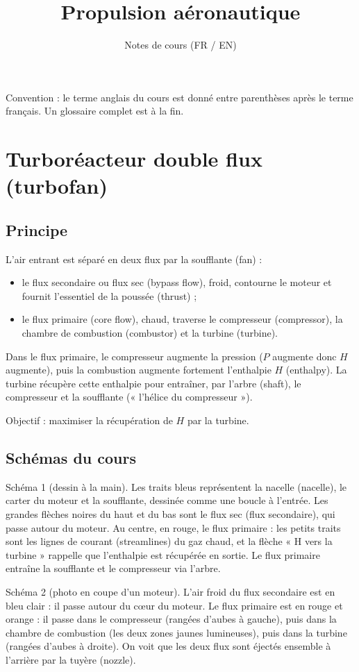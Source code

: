 \documentclass{article}
\title{Propulsion aéronautique}
\author{Notes de cours (FR / EN)}
\begin{document}
\maketitle

Convention : le terme anglais du cours est donné entre parenthèses après le terme français. Un glossaire complet est à la fin.

\section{Turboréacteur double flux (turbofan)}

\subsection{Principe}
L'air entrant est séparé en deux flux par la soufflante (fan) :
\begin{itemize}
\item le flux secondaire ou flux sec (bypass flow), froid, contourne le moteur et fournit l'essentiel de la poussée (thrust) ;
\item le flux primaire (core flow), chaud, traverse le compresseur (compressor), la chambre de combustion (combustor) et la turbine (turbine).
\end{itemize}

Dans le flux primaire, le compresseur augmente la pression ($P$ augmente donc $H$ augmente), puis la combustion augmente fortement l'enthalpie $H$ (enthalpy). La turbine récupère cette enthalpie pour entraîner, par l'arbre (shaft), le compresseur et la soufflante (« l'hélice du compresseur »).

Objectif : maximiser la récupération de $H$ par la turbine.

\subsection{Schémas du cours}
Schéma 1 (dessin à la main). Les traits bleus représentent la nacelle (nacelle), le carter du moteur et la soufflante, dessinée comme une boucle à l'entrée. Les grandes flèches noires du haut et du bas sont le flux sec (flux secondaire), qui passe autour du moteur. Au centre, en rouge, le flux primaire : les petits traits sont les lignes de courant (streamlines) du gaz chaud, et la flèche « H vers la turbine » rappelle que l'enthalpie est récupérée en sortie. Le flux primaire entraîne la soufflante et le compresseur via l'arbre.

Schéma 2 (photo en coupe d'un moteur). L'air froid du flux secondaire est en bleu clair : il passe autour du cœur du moteur. Le flux primaire est en rouge et orange : il passe dans le compresseur (rangées d'aubes à gauche), puis dans la chambre de combustion (les deux zones jaunes lumineuses), puis dans la turbine (rangées d'aubes à droite). On voit que les deux flux sont éjectés ensemble à l'arrière par la tuyère (nozzle).
\end{document}
